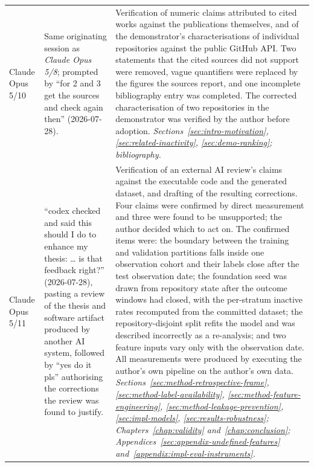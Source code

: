 {\begin{longtable}{p{} p{} p{}}
Claude Opus 5/10
& Same originating session as \emph{Claude Opus 5/8}; prompted by ``for 2 and 3 get the
sources and check again then'' (2026-07-28).
& Verification of numeric claims attributed to cited works against the publications
themselves, and of the demonstrator's characterisations of individual repositories
against the public GitHub API. Two statements that the cited sources did not support were
removed, vague quantifiers were replaced by the figures the sources report, and one
incomplete bibliography entry was completed. The corrected characterisation of two
repositories in the demonstrator was verified by the author before adoption. \newline
\emph{Sections~\ref{sec:intro-motivation}, \ref{sec:related-inactivity},
\ref{sec:demo-ranking}; bibliography.} \\

Claude Opus 5/11
& ``codex checked and said this should I do to enhance my thesis: \ldots{} is that
feedback right?'' (2026-07-28), pasting a review of the thesis and software artifact
produced by another AI system, followed by ``yes do it pls'' authorising the corrections
the review was found to justify.
& Verification of an external AI review's claims against the executable code and the
generated dataset, and drafting of the resulting corrections. Four claims were confirmed
by direct measurement and three were found to be unsupported; the author decided which to
act on. The confirmed items were: the boundary between the training and validation
partitions falls inside one observation cohort and their labels close after the test
observation date; the foundation seed was drawn from repository state after the outcome
windows had closed, with the per-stratum inactive rates recomputed from the committed
dataset; the repository-disjoint split refits the model and was described incorrectly as a
re-analysis; and two feature inputs vary only with the observation date. All measurements
were produced by executing the author's own pipeline on the author's own data. \newline
\emph{Sections~\ref{sec:method-retrospective-frame},
\ref{sec:method-label-availability},
\ref{sec:method-feature-engineering}, \ref{sec:method-leakage-prevention},
\ref{sec:impl-models}, \ref{sec:results-robustness};
Chapters~\ref{chap:validity} and~\ref{chap:conclusion};
Appendices~\ref{sec:appendix-undefined-features}
and~\ref{appendix:impl-eval-instruments}.} \\


\end{longtable}}
